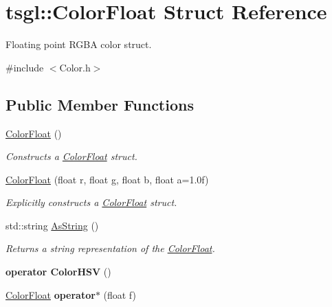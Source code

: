 \hypertarget{structtsgl_1_1_color_float}{}\section{tsgl\+:\+:Color\+Float Struct Reference}
\label{structtsgl_1_1_color_float}


Floating point R\+G\+B\+A color struct.  




{\ttfamily \#include $<$Color.\+h$>$}

\subsection*{Public Member Functions}
\begin{DoxyCompactItemize}
\item 
\hyperlink{structtsgl_1_1_color_float_a22e82c71a0feedbb7b3e3a7a73b80e30}{Color\+Float} ()
\begin{DoxyCompactList}\small\item\em Constructs a \hyperlink{structtsgl_1_1_color_float}{Color\+Float} struct. \end{DoxyCompactList}\item 
\hyperlink{structtsgl_1_1_color_float_a6c46a2073d9e208aa3f07cc04565a489}{Color\+Float} (float r, float g, float b, float a=1.\+0f)
\begin{DoxyCompactList}\small\item\em Explicitly constructs a \hyperlink{structtsgl_1_1_color_float}{Color\+Float} struct. \end{DoxyCompactList}\item 
std\+::string \hyperlink{structtsgl_1_1_color_float_a5418c902d40f74a293c6ecbcecfb501e}{As\+String} ()
\begin{DoxyCompactList}\small\item\em Returns a string representation of the \hyperlink{structtsgl_1_1_color_float}{Color\+Float}. \end{DoxyCompactList}\item 
\hypertarget{structtsgl_1_1_color_float_a4d74b061239eed7eb351422c18e33a37}{}{\bfseries operator Color\+H\+S\+V} ()\label{structtsgl_1_1_color_float_a4d74b061239eed7eb351422c18e33a37}

\item 
\hypertarget{structtsgl_1_1_color_float_a09d7cc47ac3d0e23ef7339ccf33111a5}{}\hyperlink{structtsgl_1_1_color_float}{Color\+Float} {\bfseries operator$\ast$} (float f)\label{structtsgl_1_1_color_float_a09d7cc47ac3d0e23ef7339ccf33111a5}


\end{DoxyCompactItemize}
